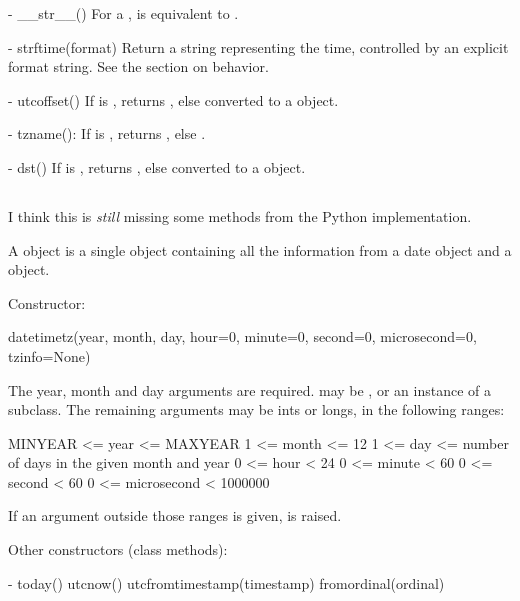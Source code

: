   - __str__()
    For a  ,  is equivalent to
    .

  - strftime(format)
    Return a string representing the time, controlled by an explicit
    format string.  See the section on  behavior.

  - utcoffset()
    If  is , returns , else
     converted to a 
    object.

  - tzname():
    If  is , returns , else
    .

  - dst()
    If  is , returns , else
     converted to a  object.



\subsection{   \label{datetime-datetimetz}}

\begin{notice}[warning]
  I think this is \emph{still} missing some methods from the
  Python implementation.
\end{notice}

A  object is a single object containing all the information
from a date object and a  object.

Constructor:

    datetimetz(year, month, day,
               hour=0, minute=0, second=0, microsecond=0, tzinfo=None)

    The year, month and day arguments are required.   may
    be , or an instance of a  subclass.  The
    remaining arguments may be ints or longs, in the following ranges:

        MINYEAR <= year <= MAXYEAR
        1 <= month <= 12
        1 <= day <= number of days in the given month and year
        0 <= hour < 24
        0 <= minute < 60
        0 <= second < 60
        0 <= microsecond < 1000000

    If an argument outside those ranges is given,
     is raised.

Other constructors (class methods):

  - today()
    utcnow()
    utcfromtimestamp(timestamp)
    fromordinal(ordinal)

